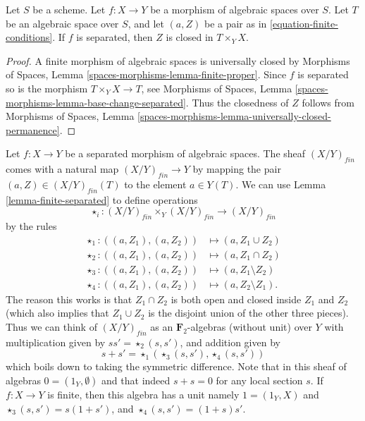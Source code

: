 \begin{lemma}
\label{lemma-finite-separated}
Let $S$ be a scheme.
Let $f : X \to Y$ be a morphism of algebraic spaces over $S$.
Let $T$ be an algebraic space over $S$, and let $(a, Z)$ be
a pair as in \ref{equation-finite-conditions}.
If $f$ is separated, then $Z$ is closed in $T \times_Y X$.
\end{lemma}

\begin{proof}
A finite morphism of algebraic spaces is universally closed by
Morphisms of Spaces, Lemma \ref{spaces-morphisms-lemma-finite-proper}.
Since $f$ is separated so is the morphism $T \times_Y X \to T$, see
Morphisms of Spaces, Lemma \ref{spaces-morphisms-lemma-base-change-separated}.
Thus the closedness of $Z$ follows from
Morphisms of Spaces,
Lemma \ref{spaces-morphisms-lemma-universally-closed-permanence}.
\end{proof}

\begin{remark}
\label{remark-finite-monoid}
Let $f : X \to Y$ be a separated morphism of algebraic spaces.
The sheaf $(X/Y)_{fin}$ comes with a natural map
$(X/Y)_{fin} \to Y$ by mapping the pair $(a, Z) \in (X/Y)_{fin}(T)$
to the element $a \in Y(T)$. We can use
Lemma \ref{lemma-finite-separated}
to define operations
$$
\star_i : (X/Y)_{fin} \times_Y (X/Y)_{fin} \longrightarrow (X/Y)_{fin}
$$
by the rules
\begin{align*}
\star_1 : ((a, Z_1), (a, Z_2)) & \longmapsto (a, Z_1 \cup Z_2) \\
\star_2 : ((a, Z_1), (a, Z_2)) & \longmapsto (a, Z_1 \cap Z_2) \\
\star_3 : ((a, Z_1), (a, Z_2)) & \longmapsto (a, Z_1 \setminus Z_2) \\
\star_4 : ((a, Z_1), (a, Z_2)) & \longmapsto (a, Z_2 \setminus Z_1).
\end{align*}
The reason this works is that $Z_1 \cap Z_2$ is both open and closed
inside $Z_1$ and $Z_2$ (which also implies that $Z_1 \cup Z_2$ is
the disjoint union of the other three pieces).
Thus we can think of $(X/Y)_{fin}$ as an $\mathbf{F}_2$-algebras
(without unit) over $Y$ with multiplication given by
$ss' = \star_2(s, s')$, and addition given by
$$
s + s' = \star_1(\star_3(s, s'), \star_4(s, s'))
$$
which boils down to taking the symmetric difference.
Note that in this sheaf of algebras $0 = (1_Y, \emptyset)$
and that indeed $s + s = 0$ for any local section $s$.
If $f : X \to Y$ is finite, then this algebra has a unit namely
$1 = (1_Y, X)$ and $\star_3(s, s') = s(1 + s')$, and
$\star_4(s, s') = (1 + s)s'$.
\end{remark}

